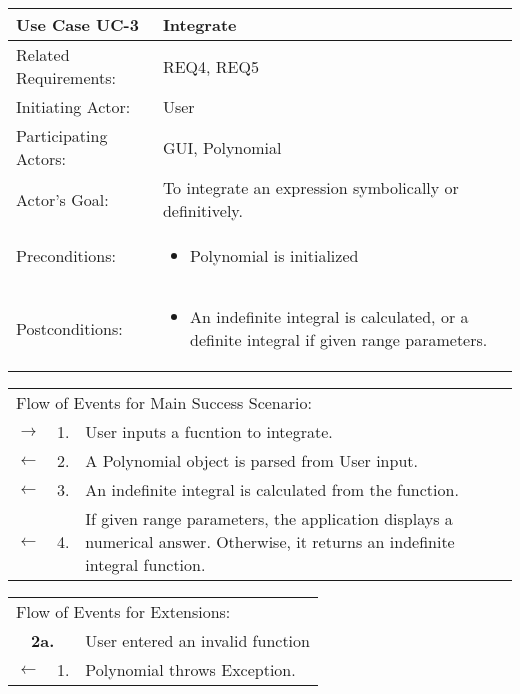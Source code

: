 \documentclass[11pt]{article}
\begin{document}
\newpage
\begin{center}
\begin{tabular}{p{1.5in}p{5in}}
\hline
\textbf{Use Case UC-3}     & \textbf{Integrate} \\ \hline
Related Requirements: & REQ4, REQ5 \\
Initiating Actor:     & User \\
Participating Actors: & GUI, Polynomial \\
Actor's Goal:          & To integrate an expression symbolically or definitively. \\
Preconditions:         & \begin{itemize}[nosep]
		      \item  Polynomial is initialized
                         \end{itemize} \\
Postconditions:        & \begin{itemize}[nosep]
                         \item An indefinite integral is calculated, or a definite integral if given range parameters.
                         \end{itemize} \\ \hline
\end{tabular}

\begin{tabular}{p{.25in}p{.25in}p{5.8in}}
\multicolumn{3}{l}{Flow of Events for Main Success Scenario:} \\
$\rightarrow$ & 1. & User inputs a fucntion to integrate.\\
$\leftarrow$  & 2. & A Polynomial object is parsed from User input.\\
$\leftarrow$  & 3. & An indefinite integral is calculated from the function.\\
$\leftarrow$  & 4. & If given range parameters, the application displays a numerical answer. Otherwise, it returns an indefinite integral function. 
\end{tabular}

\begin{tabular}{p{.25in}p{.25in}p{5.8in}}
\multicolumn{3}{l}{Flow of Events for Extensions:} \\
\multicolumn{2}{c}{\textbf{2a.}} & User entered an invalid function \\
$\leftarrow$  & 1.           & Polynomial throws Exception.\\
\end{tabular}
\end{center}
\end{document}

